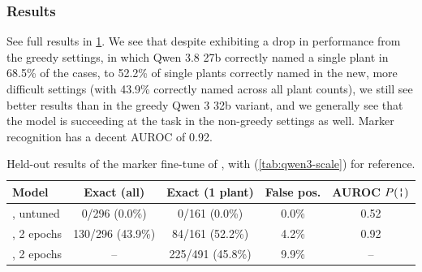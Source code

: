 \subsubsection{Results}
\label{sec:qwen-3-8-results}
See full results in \cref{tab:qwen38-marker}. We see that despite exhibiting a drop in performance from the greedy settings, in which Qwen 3.8 27b correctly named a single plant in 68.5\% of the cases, to 52.2\% of single plants correctly named in the new, more difficult settings (with 43.9\% correctly named across all plant counts), we still see better results than in the greedy Qwen 3 32b variant, and we generally see that the model is succeeding at the task in the non-greedy settings as well. Marker recognition has a decent AUROC of 0.92.

\begin{table}[t]
\centering
\caption{Held-out results of the marker fine-tune of \qwenB{}, with \qwenA{} (\cref{tab:qwen3-scale}) for reference.}
\label{tab:qwen38-marker}
\begin{tabular}{lcccc}
\toprule
Model & Exact (all) & Exact (1 plant) & False pos. & AUROC $P(\marker)$ \\
\midrule
\qwenB{}, untuned & \phantom{00}0/296 (0.0\%) & \phantom{0}0/161 (0.0\%) & 0.0\% & 0.52 \\
\qwenB{}, 2 epochs & 130/296 (43.9\%) & 84/161 (52.2\%) & 4.2\% & 0.92 \\
\midrule
\qwenA{}, 2 epochs & -- & 225/491 (45.8\%) & 9.9\% & -- \\
\bottomrule
\end{tabular}
\end{table}


